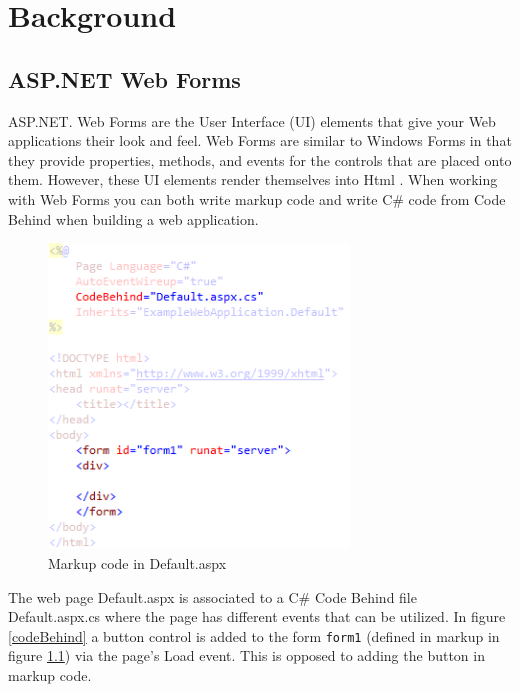 \chapter{Background}

\section{ASP.NET Web Forms} %
\label{sec:asp_net_web_forms}
	ASP.NET. Web Forms are the User Interface (UI) elements that give your Web applications their look and feel. Web Forms are similar to Windows Forms \cite{msdn01} in that they provide properties, methods, and events for the controls that are placed onto them. However, these UI elements render themselves into Html \cite{msdn02}. When working with Web Forms you can both write markup code and write C\# code from Code Behind when building a web application. 

	\begin{figure}[H]
					\includegraphics[width=8cm]{resources/images/Markup.png}
				\caption{Markup code in Default.aspx}
				\label{markup}
			\end{figure}

	The web page Default.aspx is associated to a C\# Code Behind file Default.aspx.cs where the page has different events that can be utilized. In figure \ref{codeBehind} a button control is added to the form \texttt{form1} (defined in markup in figure \ref{markup}) via the page’s Load event. This is opposed to adding the button in markup code.


